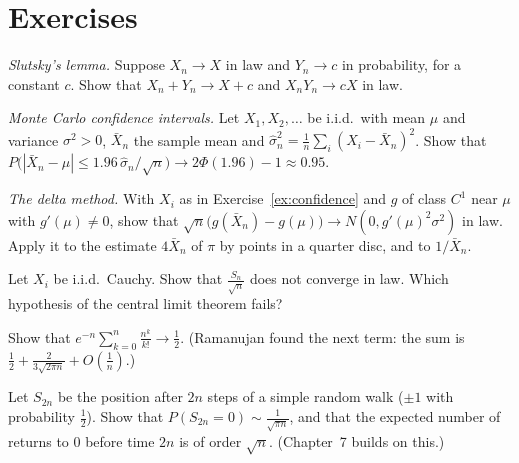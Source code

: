 \section{Exercises}

\begin{exercise}[$\star\star$]\label{ex:slutsky}
\emph{Slutsky's lemma.} Suppose $X_n\to X$ in law and $Y_n\to c$ in probability, for a constant $c$. Show that $X_n+Y_n\to X+c$ and
$X_nY_n\to cX$ in law.
\end{exercise}

\begin{exercise}[$\star$]\label{ex:confidence}
\emph{Monte Carlo confidence intervals.} Let $X_1,X_2,\ldots$ be i.i.d.\ with mean $\mu$ and variance $\sigma^2>0$, $\bar X_n$ the sample mean and
$\hat\sigma_n^2=\frac1n\sum_i(X_i-\bar X_n)^2$. Show that $P\bigl(|\bar X_n-\mu|\le1.96\,\hat\sigma_n/\sqrt n\bigr)\to2\Phi(1.96)-1\approx0.95$.
\end{exercise}

\begin{exercise}[$\star\star$]\label{ex:delta}
\emph{The delta method.} With $X_i$ as in Exercise~\ref{ex:confidence} and $g$ of class $C^1$ near $\mu$ with $g'(\mu)\ne0$, show that
$\sqrt n\bigl(g(\bar X_n)-g(\mu)\bigr)\to N(0,g'(\mu)^2\sigma^2)$ in law. Apply it to the estimate $4\bar X_n$ of $\pi$ by points in a quarter disc, and to $1/\bar X_n$.
\end{exercise}

\begin{exercise}[$\star$]\label{ex:cauchyclt}
Let $X_i$ be i.i.d.\ Cauchy. Show that $\frac{S_n}{\sqrt n}$ does not converge in law. Which hypothesis of the central limit theorem fails?
\end{exercise}

\begin{exercise}[$\star\star$]\label{ex:poissonhalf}
Show that $e^{-n}\sum_{k=0}^n\frac{n^k}{k!}\to\frac12$. (Ramanujan found the next term: the sum is $\frac12+\frac2{3\sqrt{2\pi n}}+O(\frac1n)$.)
\end{exercise}

\begin{exercise}[$\star\star$]\label{ex:returns}
Let $S_{2n}$ be the position after $2n$ steps of a simple random walk ($\pm1$ with probability $\frac12$). Show that $P(S_{2n}=0)\sim\frac1{\sqrt{\pi n}}$, and that
the expected number of returns to $0$ before time $2n$ is of order $\sqrt n$. (Chapter~7 builds on this.)
\end{exercise}

